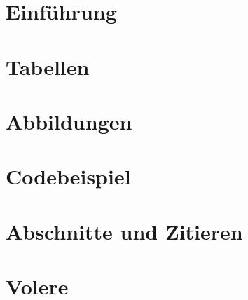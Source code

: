 \documentclass[a4paper, 12pt, oneside, BCOR1cm,toc=chapterentrywithdots]{scrbook}
\begin{document}
\onecolumn

\chapter{Einführung}

\chapter{Tabellen}

\chapter{Abbildungen}

\chapter{Codebeispiel}

\chapter{Abschnitte und Zitieren} %



\chapter{Volere} %









\renewcommand{\bibname}{Literaturverzeichnis}


\printindex
\end{document}
